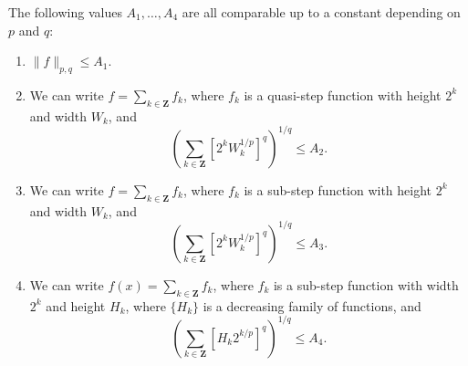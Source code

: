 \begin{theorem}
    The following values $A_1, \dots, A_4$ are all comparable up to a constant depending on $p$ and $q$:
    \begin{enumerate}
        \item \label{onebound} $\| f \|_{p,q} \leq A_1$.

        \item \label{twobound} We can write $f = \sum_{k \in \mathbf{Z}} f_k$, where $f_k$ is a quasi-step function with height $2^k$ and width $W_k$, and
        \[ \left( \sum_{k \in \mathbf{Z}} \left[ 2^k W_k^{1/p} \right]^q \right)^{1/q} \leq A_2. \]

        \item \label{threebound} We can write $f = \sum_{k \in \mathbf{Z}} f_k$, where $f_k$ is a sub-step function with height $2^k$ and width $W_k$, and
        \[ \left( \sum_{k \in \mathbf{Z}} \left[2^{k} W_k^{1/p} \right]^q \right)^{1/q} \leq A_3. \]

        \item \label{fourbound} We can write $f(x) = \sum_{k \in \mathbf{Z}} f_k$, where $f_k$ is a sub-step function with width $2^k$ and height $H_k$, where $\{ H_k \}$ is a decreasing family of functions, and
        \[ \left( \sum_{k \in \mathbf{Z}} \left[H_k 2^{k/p} \right]^q \right)^{1/q} \leq A_4. \]
    \end{enumerate}
\end{theorem}

